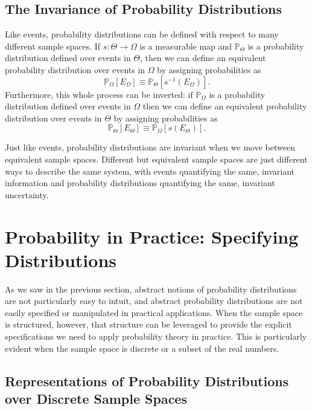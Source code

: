 \documentclass[11pt, oneside]{article}
\newcommand{\PP}{ \mathbb{P} }
\begin{document}
\subsection{The Invariance of Probability Distributions}

Like events, probability distributions can be defined with respect
to many different sample spaces.  If $s : \Theta \rightarrow 
\Omega$ is a measurable map and $\PP_{\Theta}$ is a probability
distribution defined over events in $\Theta$, then we can define an 
equivalent probability distribution over events in $\Omega$ by 
assigning probabilities as
%
\begin{equation*}
\PP_{\Omega} \! \left[ E_{\Omega} \right]
\equiv
\PP_{\Theta} \! \left[ s^{-1} \! \left( E_{\Omega} \right) \right].
\end{equation*}
%
Furthermore, this whole process can be inverted: if $\PP_{\Omega}$ 
is a probability distribution defined over events in $\Omega$ then 
we can define an equivalent probability distribution over events in 
$\Theta$ by assigning probabilities as
%
\begin{equation*}
\PP_{\Theta} \! \left[ E_{\Theta} \right]
\equiv
\PP_{\Omega} \! \left[ s \! \left( E_{\Theta} \right) \right].
\end{equation*}

Just like events, probability distributions are invariant when we
move between equivalent sample spaces.  Different but equivalent
sample spaces are just different ways to describe the same system,
with events quantifying the same, invariant information and probability 
distributions quantifying the same, invariant uncertainty.

\section{Probability in Practice: Specifying Distributions}

As we saw in the previous section, abstract notions of probability
distributions are not particularly easy to intuit, and abstract
probability distributions are not easily specified or manipulated
in practical applications.  When the sample space is structured, 
however, that structure can be leveraged to provide the explicit 
specifications we need to apply probability theory in practice.  
This is particularly evident when the sample space is discrete 
or a subset of the real numbers.

\subsection{Representations of Probability Distributions over
Discrete Sample Spaces}
\end{document}

